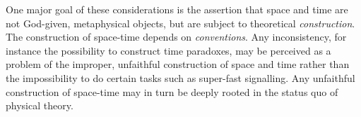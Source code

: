 \documentclass[pra,amsfonts, twocolumn]{revtex4}
\begin{document}
%
%
%

 One major goal of these considerations is the assertion that space and
 time are not God-given, metaphysical objects, but are subject to
 theoretical {\em construction}. The construction of space-time depends
 on {\em conventions}. Any inconsistency, for instance the possibility to
 construct time paradoxes, may be perceived as a problem of the improper,
 unfaithful construction of space and time rather than the impossibility
 to do certain tasks such as super-fast signalling. Any unfaithful
 construction of space-time may in turn be deeply rooted in the status
 quo of physical theory.
\end{document}
